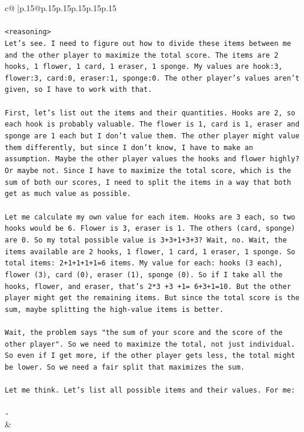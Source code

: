 \documentclass{article}
\begin{document}
{\begin{supertabular}{c@{$\;$}|p{.15\linewidth}@{}p{.15\linewidth}p{.15\linewidth}p{.15\linewidth}p{.15\linewidth}p{.15\linewidth}}
{{{\\ 
\\ 
\texttt{<reasoning>} \\
\texttt{Let's see. I need to figure out how to divide these items between me and the other player to maximize the total score. The items are 2 hooks, 1 flower, 1 card, 1 eraser, 1 sponge. My values are hook:3, flower:3, card:0, eraser:1, sponge:0. The other player's values aren't given, so I have to work with that.} \\
\\ 
\texttt{First, let's list out the items and their quantities. Hooks are 2, so each hook is probably valuable. The flower is 1, card is 1, eraser and sponge are 1 each but I don't value them. The other player might value them differently, but since I don't know, I have to make an assumption. Maybe the other player values the hooks and flower highly? Or maybe not. Since I have to maximize the total score, which is the sum of both our scores, I need to split the items in a way that both get as much value as possible.} \\
\\ 
\texttt{Let me calculate my own value for each item. Hooks are 3 each, so two hooks would be 6. Flower is 3, eraser is 1. The others (card, sponge) are 0. So my total possible value is 3+3+1+3+3? Wait, no. Wait, the items available are 2 hooks, 1 flower, 1 card, 1 eraser, 1 sponge. So total items: 2+1+1+1+1=6 items. My value for each: hooks (3 each), flower (3), card (0), eraser (1), sponge (0). So if I take all the hooks, flower, and eraser, that's 2*3 +3 +1= 6+3+1=10. But the other player might get the remaining items. But since the total score is the sum, maybe splitting the high{-}value items is better.} \\
\\ 
\texttt{Wait, the problem says "the sum of your score and the score of the other player". So we need to maximize the total, not just individual. So even if I get more, if the other player gets less, the total might be lower. So we need a fair split that maximizes the sum.} \\
\\ 
\texttt{Let me think. Let's list all possible items and their values. For me:} \\
\\ 
\texttt{{-}} \\
            }
        }
    }
    & \\ \\


\end{supertabular}}
\end{document}
